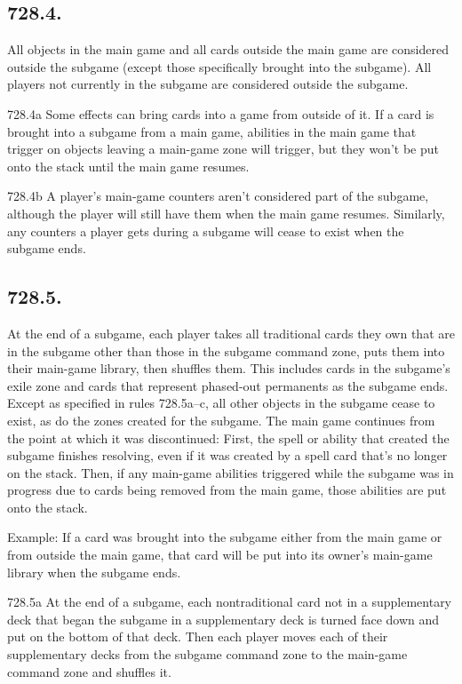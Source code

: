 \subsection*{728.4.}
All objects in the main game and all cards outside the main game are considered outside the subgame (except those specifically brought into the subgame). All players not currently in the subgame are considered outside the subgame.

728.4a Some effects can bring cards into a game from outside of it. If a card is brought into a subgame from a main game, abilities in the main game that trigger on objects leaving a main-game zone will trigger, but they won’t be put onto the stack until the main game resumes.

728.4b A player’s main-game counters aren’t considered part of the subgame, although the player will still have them when the main game resumes. Similarly, any counters a player gets during a subgame will cease to exist when the subgame ends.

\subsection*{728.5.}
At the end of a subgame, each player takes all traditional cards they own that are in the subgame other than those in the subgame command zone, puts them into their main-game library, then shuffles them. This includes cards in the subgame’s exile zone and cards that represent phased-out permanents as the subgame ends. Except as specified in rules 728.5a–c, all other objects in the subgame cease to exist, as do the zones created for the subgame. The main game continues from the point at which it was discontinued: First, the spell or ability that created the subgame finishes resolving, even if it was created by a spell card that’s no longer on the stack. Then, if any main-game abilities triggered while the subgame was in progress due to cards being removed from the main game, those abilities are put onto the stack.

Example: If a card was brought into the subgame either from the main game or from outside the main game, that card will be put into its owner’s main-game library when the subgame ends.

728.5a At the end of a subgame, each nontraditional card not in a supplementary deck that began the subgame in a supplementary deck is turned face down and put on the bottom of that deck. Then each player moves each of their supplementary decks from the subgame command zone to the main-game command zone and shuffles it.


